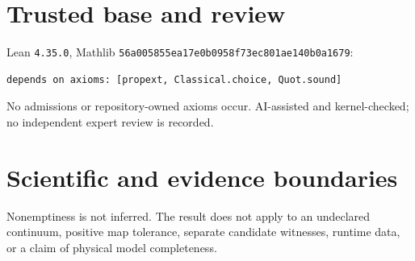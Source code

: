 \documentclass[11pt]{article}
\begin{document}
\section{Trusted base and review}
Lean \texttt{4.35.0}, Mathlib
\texttt{56a005855ea17e0b0958f73ec801ae140b0a1679}:
\begin{lstlisting}
depends on axioms: [propext, Classical.choice, Quot.sound]
\end{lstlisting}
No admissions or repository-owned axioms occur. AI-assisted and kernel-checked; no
independent expert review is recorded.
\section{Scientific and evidence boundaries}
Nonemptiness is not inferred. The result does not apply to an undeclared continuum,
positive map tolerance, separate candidate witnesses, runtime data, or a claim of
physical model completeness.
\end{document}
